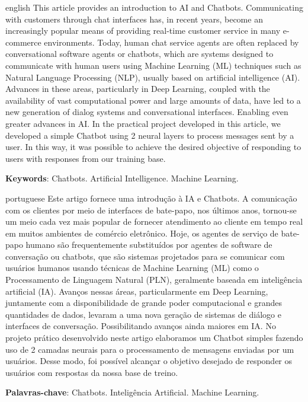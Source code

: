 \documentclass[
	12pt,				%
	openright,			%
	twoside,			%
	a4paper,			%
	english,			%
	french,				%
	spanish,			%
	brazil				%
	]{abntex2}
\begin{document}
\begin{resumo}[Abstract]
	\begin{otherlanguage*}{english}
		This article provides an introduction to AI and Chatbots. Communicating with customers through chat interfaces has, in recent years, become an increasingly popular means of providing real-time customer service in many e-commerce environments. Today, human chat service agents are often replaced by conversational software agents or chatbots, which are systems designed to communicate with human users using Machine Learning (ML) techniques such as Natural Language Processing (NLP), usually based on artificial intelligence (AI). Advances in these areas, particularly in Deep Learning, coupled with the availability of vast computational power and large amounts of data, have led to a new generation of dialog systems and conversational interfaces. Enabling even greater advances in AI. In the practical project developed in this article, we developed a simple Chatbot using 2 neural layers to process messages sent by a user. In this way, it was possible to achieve the desired objective of responding to users with responses from our training base.
		\vspace{\onelineskip}

		\noindent
		\textbf{Keywords}: Chatbots. Artificial Intelligence. Machine Learning.
	\end{otherlanguage*}
\end{resumo}
\setlength{\absparsep}{18pt} %
\begin{resumo}[Resumo]
	\begin{otherlanguage*}{portuguese}
		Este artigo fornece uma introdução à IA e Chatbots. A comunicação com os clientes por meio de interfaces de bate-papo, nos últimos anos, tornou-se um meio cada vez mais popular de fornecer atendimento ao cliente em tempo real em muitos ambientes de comércio eletrônico. Hoje, os agentes de serviço de bate-papo humano são frequentemente substituídos por agentes de software de conversação ou chatbots, que são sistemas projetados para se comunicar com usuários humanos usando técnicas de Machine Learning (ML) como o Processamento de Linguagem Natural (PLN), geralmente baseada em inteligência artificial (IA).
		Avanços nessas áreas, particularmente em Deep Learning, juntamente com a disponibilidade de grande poder computacional e grandes quantidades de dados, levaram a uma nova geração de sistemas de diálogo e interfaces de conversação. Possibilitando avanços ainda maiores em IA.
		No projeto prático desenvolvido neste artigo elaboramos um Chatbot simples fazendo uso de 2 camadas neurais para o processamento de mensagens enviadas por um usuários.
		Desse modo, foi possível  alcançar o objetivo desejado de responder os usuários com respostas da nossa base de treino.
		\vspace{\onelineskip}

		\noindent
		\textbf{Palavras-chave}: Chatbots. Inteligência Artificial. Machine Learning.
	\end{otherlanguage*}
\end{resumo}
\end{document}
